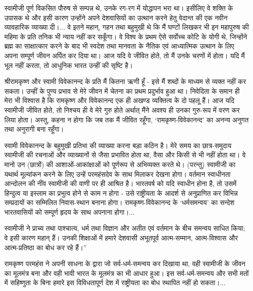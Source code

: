 \newpage

स्वामीजी पूर्ण विकसित पौरुष से सम्पन्न थे, उनके रग-रग में योद्धापन भरा था। इसीलिए वे शक्ति के उपासक थे और इसी कारण उन्होंने अपने देशवासियों का उत्थान करने हेतु वेदान्त की एक नवीन व्यावहारिक व्याख्या दी।... वे इतने महान्, गहन तथा बहुमुखी थे कि मैं घण्टों लिखकर भी इन महापुरुष की महिमा के प्रति तनिक भी न्याय नहीं कर सकूँगा। वे विश्व के प्रथम ऐसे सर्वोच्च कोटि के योगी थे, जिन्होंने ब्रह्म का साक्षात्कार करने के बाद भी स्वदेश तथा मानवता के नैतिक एवं आध्यात्मिक उत्थान के लिए अपना सम्पूर्ण जीवन अर्पित कर दिया था। आज यदि वे जीवित होते, तो मैं उनके चरणों में होता। यदि मैं भूल नहीं करता, तो आधुनिक भारत उन्हीं की सृष्टि है। 

श्रीरामकृष्ण और स्वामी विवेकानन्द के प्रति मैं कितना ऋणी हूँ - इसे मैं शब्दों के माध्यम से व्यक्त नहीं कर सकता। उन्हीं के पुण्य प्रभाव से मेरे जीवन में चेतना का प्रथम प्रदुर्भाव हुआ था। निवेदिता के समान ही मेरा भी विश्वास है कि रामकृष्ण और विवेकानन्द एक ही अखण्ड व्यक्तित्व के दो पहलू हैं। आज यदि स्वामीजी जीवित होते, तो निश्चय ही वे मेरे गुरु होते अर्थात् मैंने अवश्य ही उनका गुरु-रूप में वरण कर लिया होता। अस्तु, कहना न होगा कि जब तक मैं जीवित रहूँगा, ‘रामकृष्ण-विवेकानन्द’ का अनन्य अनुगत तथा अनुरागी बना रहूँगा। 

स्वामी विवेकानन्द के बहुमुखी प्रतिभा की व्याख्या करना बड़ा कठिन है। मेरे समय का छात्र-समुदाय स्वामीजी की रचनाओं और व्याख्यानों से जैसा प्रभावित होता था, वैसा और किसी से भी नहीं होता था। वे मानो उन (छात्रों) की आशाओं-आकांक्षाओं को पूर्णरूप से अभिव्यक्त करते थे। (परन्तु) स्वामीजी का यथार्थ मूल्यांकन करने के लिए उन्हें परमहंसदेव के साथ मिलाकर देखना होगा। वर्तमान स्वाधीनता आन्दोलन की नींव स्वामीजी की वाणी पर ही आश्रित है। भारतवर्ष को यदि स्वाधीन होना है, तो उसमें हिन्दुत्व या इस्लाम का प्रभुत्व होने से काम न होगा - उसे राष्ट्रीयता के आदर्श से अनुप्राणित कर विभिन्न सम्प्रदायों का सम्मिलित निवास-स्थान बनाना होगा। रामकृष्ण-विवेकानन्द के ‘धर्मसमन्वय’ का सन्देश भारतवासियों को सम्पूर्ण हृदय के साथ अपनाना होगा।... 

स्वामीजी ने प्राच्य तथा पाश्चात्य, धर्म तथा विज्ञान और अतीत एवं वर्तमान के बीच समन्वय साधित किया; वे इसी कारण महान् हैं। उनकी शिक्षाओं में हमारे देशवासी अभूतपूर्व आत्म-सम्मान, आत्म-विश्वास और आत्म-प्रतिष्ठा का बोध कर रहे हैं।” 

रामकृष्ण परमहंस ने अपनी साधना के द्वारा जो सर्व-धर्म-समन्वय कर दिखाया था, वही स्वामीजी के जीवन का मूलमंत्र बना और वही भावी भारत के मूलमंत्र का भी आधार हुआ। इस सर्व-धर्म-समन्वय और सभी मतों में सहिष्णुता के बिना हमारे इस विविधतापूर्ण देश में राष्ट्रीयता का बोध स्थापित नहीं हो सकता।... 

